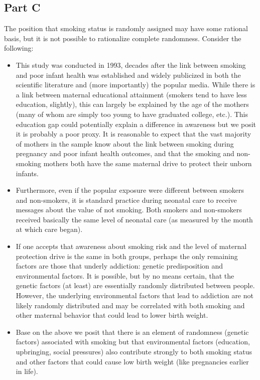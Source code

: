 \documentclass[a4paper, 12pt]{article}
\begin{document}
\subsection{Part C}
The position that smoking status is randomly assigned may have some rational basis, but it is not possible to rationalize complete randomness.  Consider the following:

\begin{itemize}
\item This study was conducted in 1993, decades after the link between smoking and poor infant health was established and widely publicized in both the scientific literature and (more importantly) the popular media.  While there is a link between maternal educational attainment (smokers tend to have less education, slightly), this can largely be explained by the age of the mothers (many of whom are simply too young to have graduated college, etc.).  This education gap could potentially explain a difference in awareness but we posit it is probably a poor proxy.  It is reasonable to expect that the vast majority of mothers in the sample know about the link between smoking during pregnancy and poor infant health outcomes, and that the smoking and non-smoking mothers both have the same maternal drive to protect their unborn infants.

\item Furthermore, even if the popular exposure were different between smokers and non-smokers, it is standard practice during neonatal care to receive messages about the value of not smoking.  Both smokers and non-smokers received basically the same level of neonatal care (as measured by the month at which care began).  

\item If one accepts that awareness about smoking risk and the level of maternal protection drive is the same in both groups, perhaps the only remaining factors are those that underly addiction: genetic predisposition and environmental factors.  It is possible, but by no means certain, that the genetic factors (at least) are essentially randomly distributed between people.  However, the underlying environmental factors that lead to addiction are not likely randomly distributed and may be correlated with both smoking and other maternal behavior that could lead to lower birth weight.  

\item Base on the above we posit that there is an element of randomness (genetic factors) associated with smoking but that environmental factors (education, upbringing, social pressures) also contribute strongly to both smoking status and other factors that could cause low birth weight (like pregnancies earlier in life).  

\end{itemize}
\end{document}
